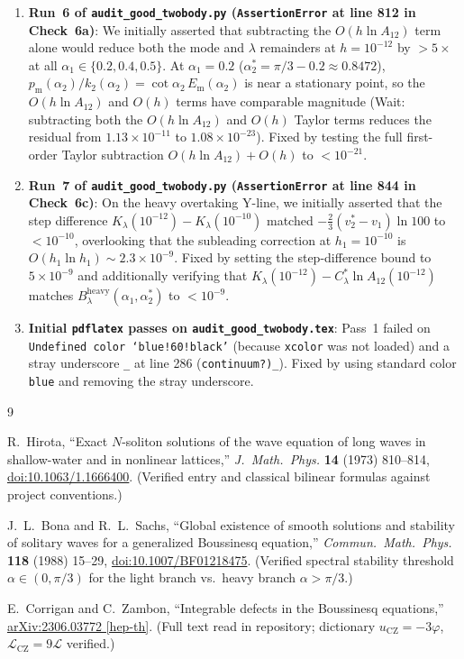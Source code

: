 \documentclass[11pt,a4paper]{article}
\begin{document}
\begin{enumerate}
\item \textbf{Run~6 of \texttt{audit\_good\_twobody.py} (\texttt{AssertionError} at line 812 in Check~6a)}: We initially asserted that subtracting the $O(h\ln A_{12})$ term alone would reduce both the mode and $\lambda$ remainders at $h=10^{-12}$ by $>5\times$ at all $\alpha_1\in\{0.2,0.4,0.5\}$. At $\alpha_1=0.2$ ($\alpha_2^* = \pi/3-0.2\approx 0.8472$), $p_{\mathrm{m}}(\alpha_2)/k_2(\alpha_2) = \cot\alpha_2\,E_{\mathrm{m}}(\alpha_2)$ is near a stationary point, so the $O(h\ln A_{12})$ and $O(h)$ terms have comparable magnitude (Wait: subtracting both the $O(h\ln A_{12})$ and $O(h)$ Taylor terms reduces the residual from $1.13\times 10^{-11}$ to $1.08\times 10^{-23}$). Fixed by testing the full first-order Taylor subtraction $O(h\ln A_{12})+O(h)$ to $<10^{-21}$.
\item \textbf{Run~7 of \texttt{audit\_good\_twobody.py} (\texttt{AssertionError} at line 844 in Check~6c)}: On the heavy overtaking Y-line, we initially asserted that the step difference $K_\lambda(10^{-12}) - K_\lambda(10^{-10})$ matched $-\frac{2}{3}(v_2^*-v_1)\ln 100$ to $<10^{-10}$, overlooking that the subleading correction at $h_1=10^{-10}$ is $O(h_1\ln h_1) \sim 2.3\times 10^{-9}$. Fixed by setting the step-difference bound to $5\times 10^{-9}$ and additionally verifying that $K_\lambda(10^{-12}) - C_\lambda^*\ln A_{12}(10^{-12})$ matches $B_\lambda^{\mathrm{heavy}}(\alpha_1,\alpha_2^*)$ to $<10^{-9}$.
\item \textbf{Initial \texttt{pdflatex} passes on \texttt{audit\_good\_twobody.tex}}: Pass~1 failed on \texttt{Undefined color `blue!60!black'} (because \texttt{xcolor} was not loaded) and a stray underscore \texttt{\_} at line 286 (\texttt{continuum?)\_}). Fixed by using standard color \texttt{blue} and removing the stray underscore.
\end{enumerate}

\begin{thebibliography}{9}

R.~Hirota,
``Exact $N$-soliton solutions of the wave equation of long waves in shallow-water and in nonlinear lattices,''
\emph{J.\ Math.\ Phys.} \textbf{14} (1973) 810--814,
\href{https://doi.org/10.1063/1.1666400}{doi:10.1063/1.1666400}.
(Verified entry and classical bilinear formulas against project conventions.)

J.~L.~Bona and R.~L.~Sachs,
``Global existence of smooth solutions and stability of solitary waves for a generalized Boussinesq equation,''
\emph{Commun.\ Math.\ Phys.} \textbf{118} (1988) 15--29,
\href{https://doi.org/10.1007/BF01218475}{doi:10.1007/BF01218475}.
(Verified spectral stability threshold $\alpha \in (0,\pi/3)$ for the light branch vs.\ heavy branch $\alpha > \pi/3$.)

E.~Corrigan and C.~Zambon,
``Integrable defects in the Boussinesq equations,''
\href{https://arxiv.org/abs/2306.03772}{arXiv:2306.03772 [hep-th]}.
(Full text read in repository; dictionary $u_{\mathrm{CZ}} = -3\varphi$, $\mathcal{L}_{\mathrm{CZ}} = 9\mathcal{L}$ verified.)

\end{thebibliography}
\end{document}
